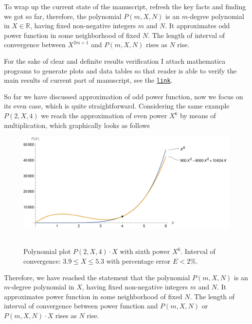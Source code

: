 To wrap up the current state of the manuscript, refresh the key facts and finding we got so far,
therefore, the polynomial $P(m,X,N)$ is an $m$-degree polynomial in $X \in \mathbb{R}$, having fixed non-negative
integers $m$ and $N$.
It approximates odd power function in some neighborhood of fixed $N$.
The length of interval of convergence between $X^{2m+1}$ and $P(m,X,N)$ rises as $N$ rise.

For the sake of clear and definite results verification I attach mathematica programs to generate
plots and data tables so that reader is able to verify the main results of current part of manuscript,
see the \href{https://gist.github.com/kolosovpetro/2b5c55094c66b8d6a97b9798be9a8dec}{\texttt{link}}.

So far we have discussed approximation of odd power function, now we focus on its even case,
which is quite straightforward.
Considering the same example $P(2, X, 4)$ we reach the approximation of even power $X^6$
by means of multiplication, which graphically looks as follows
\begin{figure}[H]
    \centering
    \includegraphics[width=1\textwidth]{sections/images/07_plot_of_6th_power_with_p_2_4_times_x}
    ~\caption{Polynomial plot $P(2, X, 4)\cdot X$ with sixth power $X^6$.
    Interval of convergence: $3.9 \leq X \leq 5.3$ with percentage error $E < 2\%$.
    }\label{fig:07_plot_of_6th_power_with_p_2_4_times_x}
\end{figure}
Therefore, we have reached the statement that
the polynomial $P(m,X,N)$ is an $m$-degree polynomial in $X$, having fixed non-negative
integers $m$ and $N$.
It approximates power function in some neighborhood of fixed $N$.
The length of interval of convergence between power function and $P(m,X,N)$ or $P(m,X,N) \cdot X$ rises as $N$ rise.
